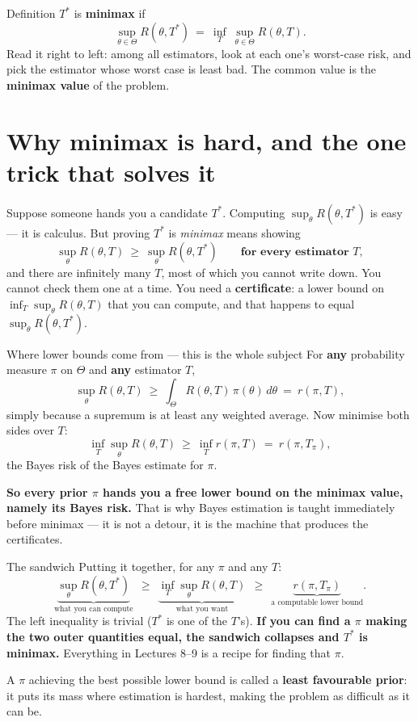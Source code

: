 \documentclass[11pt]{article}
\begin{document}
\begin{idea}{Definition}
$T^*$ is \textbf{minimax} if
\[
\sup_{\theta\in\Theta}R(\theta,T^*)\ =\ \inf_{T}\ \sup_{\theta\in\Theta}R(\theta,T).
\]
Read it right to left: among all estimators, look at each one's worst-case risk, and pick the
estimator whose worst case is least bad. The common value is the \textbf{minimax value} of the
problem.
\end{idea}

\section{Why minimax is hard, and the one trick that solves it}

Suppose someone hands you a candidate $T^*$. Computing $\sup_\theta R(\theta,T^*)$ is easy ---
it is calculus. But proving $T^*$ is \emph{minimax} means showing
\[
\sup_\theta R(\theta,T)\ \ge\ \sup_\theta R(\theta,T^*)\qquad\textbf{for every estimator }T,
\]
and there are infinitely many $T$, most of which you cannot write down. You cannot check them
one at a time. You need a \textbf{certificate}: a lower bound on $\inf_T\sup_\theta R(\theta,T)$
that you can compute, and that happens to equal $\sup_\theta R(\theta,T^*)$.

\begin{idea}{Where lower bounds come from --- this is the whole subject}
For \textbf{any} probability measure $\pi$ on $\Theta$ and \textbf{any} estimator $T$,
\[
\sup_{\theta}R(\theta,T)\ \ge\ \int_\Theta R(\theta,T)\,\pi(\theta)\,d\theta\ =\ r(\pi,T),
\]
simply because a supremum is at least any weighted average. Now minimise both sides over $T$:
\[
\inf_T\sup_\theta R(\theta,T)\ \ge\ \inf_T r(\pi,T)\ =\ r(\pi,T_\pi),
\]
the Bayes risk of the Bayes estimate for $\pi$.

\smallskip
\textbf{So every prior $\pi$ hands you a free lower bound on the minimax value, namely its
Bayes risk.} That is why Bayes estimation is taught immediately before minimax --- it is not a
detour, it is the machine that produces the certificates.
\end{idea}

\begin{idea}{The sandwich}
Putting it together, for any $\pi$ and any $T$:
\[
\underbrace{\sup_\theta R(\theta,T^*)}_{\text{what you can compute}}
\ \ \ge\ \ \underbrace{\inf_T\sup_\theta R(\theta,T)}_{\text{what you want}}
\ \ \ge\ \ \underbrace{r(\pi,T_\pi)}_{\text{a computable lower bound}} .
\]
The left inequality is trivial ($T^*$ is one of the $T$'s). \textbf{If you can find a $\pi$
making the two outer quantities equal, the sandwich collapses and $T^*$ is minimax.}
Everything in Lectures 8--9 is a recipe for finding that $\pi$.

A $\pi$ achieving the best possible lower bound is called a \textbf{least favourable prior}:
it puts its mass where estimation is hardest, making the problem as difficult as it can be.
\end{idea}
\end{document}
